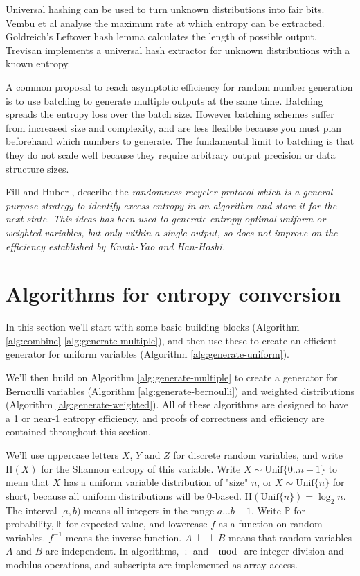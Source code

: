 \documentclass[12pt]{article}
\newcommand{\indep}{\perp\!\!\!\perp}
\newcommand{\unif}[1]{\mathrm{Unif}\{#1\}}
\newcommand{\entropy}[1]{\mathrm{H}(#1)}
\begin{document}
Universal hashing can be used to turn unknown distributions into fair bits. Vembu et al \cite{vembu95} analyse the maximum rate at which entropy can be extracted. Goldreich's Leftover hash lemma \cite{goldreich2004foundations} calculates the length of possible output. Trevisan \cite{trevisan2001extractors} implements a universal hash extractor for unknown distributions with a known entropy. 

A common proposal to reach asymptotic efficiency for random number generation is to use batching to generate multiple outputs at the same time. \cite{bacher2017,han97,devroye86,Knuth1976TheCO,lumbroso2013optimal} Batching spreads the entropy loss over the batch size. However batching schemes suffer from increased size and complexity, and are less flexible because you must plan beforehand which numbers to generate. The fundamental limit to batching is that they do not scale well because they require arbitrary output precision or data structure sizes.

Fill and Huber \cite{fill2000randomness, huber2016perfect}, describe the \em randomness recycler \em protocol which is a general purpose strategy to identify excess entropy in an algorithm and store it for the next state. This ideas has been used to generate entropy-optimal uniform \cite{lumbroso2013optimal, huber2024optimal} or weighted \cite{huber2024optimal} variables, but only within a single output, so does not improve on the efficiency established by Knuth-Yao and Han-Hoshi.


\section{Algorithms for entropy conversion}

In this section we'll start with some basic building blocks (Algorithm \ref{alg:combine}-\ref{alg:generate-multiple}), and then use these to create an efficient generator for uniform variables (Algorithm \ref{alg:generate-uniform}).

We'll then build on Algorithm \ref{alg:generate-multiple} to create a generator for Bernoulli variables (Algorithm \ref{alg:generate-bernoulli}) and weighted distributions (Algorithm \ref{alg:generate-weighted}). All of these algorithms are designed to have a 1 or near-1 entropy efficiency, and proofs of correctness and efficiency are contained throughout this section.

We'll use uppercase letters $X$, $Y$ and $Z$ for discrete random variables, and write $\entropy{X}$ for the Shannon entropy of this variable. Write $X \sim \unif{0..n-1}$ to mean that $X$ has a uniform variable distribution of "size" $n$, or $X \sim \unif{n}$ for short, because all uniform distributions will be 0-based. $\entropy{\unif{n}} = \log_2n$. The interval $[a,b)$ means all integers in the range $a...b-1$. Write $\mathbb{P}$ for probability, $\mathbb{E}$ for expected value, and lowercase $f$ as a function on random variables. $f^{-1}$ means the inverse function. $A \indep B$ means that random variables $A$ and $B$ are independent. In algorithms, $\div$ and $\mod$ are integer division and modulus operations, and subscripts are implemented as array access.
\end{document}
